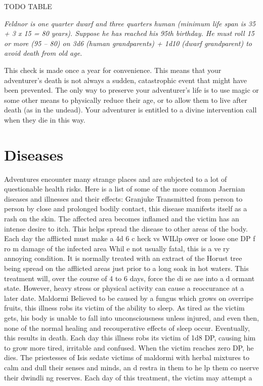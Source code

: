 \begin{multicols*}{2}
TODO TABLE

\textit{Feldnor is one quarter dwarf and three quarters human (minimum life span is 35 + 3 x 15 = 80 years). Suppose he has reached his 95th birthday. He must roll 15 or more (95 – 80) on 3d6 (human grandparents) + 1d10 (dwarf grandparent) to avoid death from old age.}

This check is made once a year for convenience. This means that your adventurer’s death is not always a sudden, catastrophic event that might have been prevented. The only way to preserve your adventurer’s life is to use magic or some other means to physically reduce their age, or to allow them to live after death (as in the undead). Your adventurer is entitled to a divine intervention call when they die in this way.
\section{Diseases}
Adventures encounter many strange places and are
subjected to a lot of questionable health risks. Here is a list of
some of the more common Jaernian diseases and illnesses and
their effects:
Granjuke
Transmitted from person to person by close and
prolonged bodily contact, this disease manifests itself as a
rash on the skin. The affected area becomes inflamed and the
victim has an intense desire to itch. This helps spread the
disease to other areas of the body. Each day the afflicted must
make a 4d 6 c heck vs WILlp ower or loose one DP f ro m
damage of the infected area
Whil e not usually fatal, this is a ve ry annoying
condition. It is normally treated with an extract of the Horust
tree being spread on the afflicted areas just prior to a long
soak in hot waters. This treatment will, over the course of 4 to
6 days, force the di se ase into a d ormant state. However,
heavy stress or physical activity can cause a reoccurance at a
later date.
Maldormi
Believed to be caused by a fungus which grows on
overripe fruits, this illness robs its victim of the ability to
sleep. As tired as the victim gets, his body is unable to fall
into unconsciousness unless injured, and even then, none of
the normal healing and recouperative effects of sleep occur.
Eventually, this results in death. Each day this illness robs its
victim of 1d8 DP, causing him to grow more tired, irritable
and confused. When the victim reaches zero DP, he dies.
The priestesses of Isis sedate victims of maldormi
with herbal mixtures to calm and dull their senses and minds,
an d restra in them to he lp them co nserve their dwindli ng
reserves. Each day of this treatment, the victim may attempt a

\end{multicols*}
